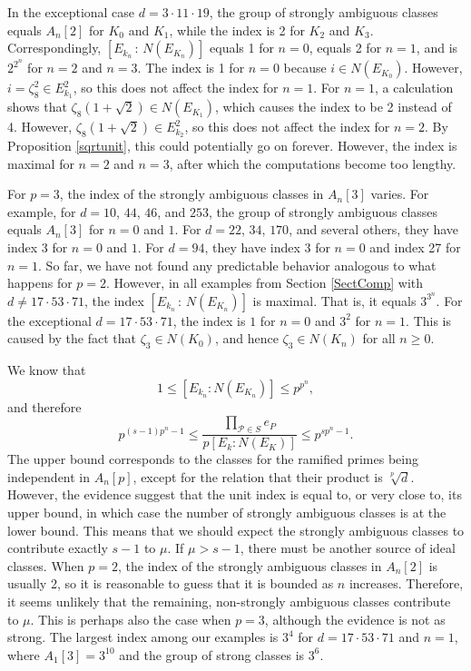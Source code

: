 \documentclass{amsart}
\begin{document}
In the exceptional case $d=3\cdot 11\cdot 19$,  the group of strongly ambiguous classes equals $A_n[2]$ for
$K_0$ and $K_1$, while the index is 2 for $K_2$ and $K_3$. Correspondingly, $[E_{k_n} \, : \, N(E_{K_n})]$ equals 1 for
$n=0$, equals 2 for $n=1$, and is $2^{2^n}$ for $n=2$ and $n=3$. The index is 1 for $n=0$ because $i\in N(E_{K_0})$.
However, $i=\zeta_8^2\in E_{k_1}^2$, so this does not affect the index for $n=1$. For $n=1$, a calculation shows that
$\zeta_8(1+\sqrt{2})\in N(E_{K_1})$, which causes the index to be 2 instead of 4. However, $\zeta_8(1+\sqrt{2})\in E_{k_2}^2$,
so this does not affect the index for $n=2$. By Proposition \ref{sqrtunit}, this could potentially go on forever.
However, the index is maximal for $n=2$ and $n=3$, after which the computations become too lengthy.

For $p=3$, the index of the strongly ambiguous classes in $A_n[3]$ varies. For example, for $d= 10$, $44$, $46$, and $253$, 
the group of strongly ambiguous classes
equals $A_n[3]$ for $n=0$ and $1$. For $d=22$, $34$, $170$, and several others, they have index $3$ for $n=0$ and $1$.
For $d=94$, they have index 3 for $n=0$ and index 27 for $n=1$. So far, we have not found any predictable behavior analogous to what happens for $p=2$.
However, in all examples from Section \ref{SectComp} with $d\ne 17\cdot 53\cdot 71$, the index $[E_{k_n} \, : \, N(E_{K_n})]$ is maximal.
That is, it equals $3^{3^n}$. For the exceptional $d= 17\cdot 53\cdot 71$, the index is $1$ for $n=0$ and $3^2$ for $n=1$.
This is caused by the fact that $\zeta_3\in N(K_0)$, and hence $\zeta_3\in N(K_n)$ for all $n\ge 0$.

We know that 
$$1\le [E_{k_n} : N(E_{K_n})]\le p^{p^n},$$
and therefore
$$
p^{(s-1)p^n-1}\le \frac{\prod_{\mathcal P \in S} e_P}{p [E_k  : N(E_K)]}\le p^{sp^n-1}.$$
The upper bound corresponds to the classes for the ramified primes being independent in $A_n[p]$, except for the relation that their product is $\sqrt[p]{d}$.
However, the evidence suggest that the unit index is equal to, or very close to, its upper bound, in which case the number of strongly ambiguous classes is at the lower bound.
This means that we should expect the strongly ambiguous classes to contribute exactly $s-1$ to $\mu$. If $\mu > s-1$, there must be another source of ideal classes.
When $p=2$, the index of the strongly ambiguous classes in $A_n[2]$ is usually 2, so it is reasonable to 
guess that it is bounded as $n$ increases. Therefore, it seems unlikely
that the remaining, non-strongly ambiguous classes contribute to $\mu$.
This is perhaps also the case when $p=3$, although the evidence is not as strong. The largest index 
among our examples is $3^4$ for $d=17\cdot 53\cdot 71$ and $n=1$,
where $A_1[3]= 3^{10}$ and the group of strong classes is $3^6$. 
\end{document}
